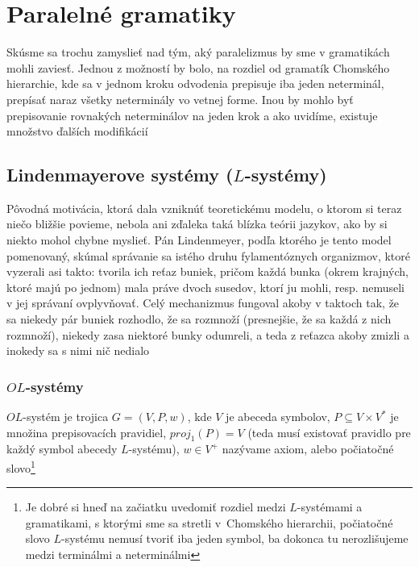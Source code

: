 \chapter{Paralelné gramatiky}

Skúsme sa trochu zamyslieť nad tým, aký paralelizmus by sme v
gramatikách mohli zaviesť. Jednou z možností by bolo, na rozdiel
od gramatík Chomského hierarchie, kde sa v jednom kroku odvodenia
prepisuje iba jeden neterminál, prepísať naraz všetky neterminály
vo vetnej forme. Inou by mohlo byť prepisovanie rovnakých
neterminálov na jeden krok a ako uvidíme, existuje množstvo
ďalších modifikácií

\section{Lindenmayerove systémy ($L$-systémy)}

\begin{motiv}
    Pôvodná motivácia, ktorá dala vzniknúť teoretickému modelu, o
    ktorom si teraz niečo bližšie povieme, nebola ani zďaleka taká
    blízka teórii jazykov, ako by si niekto mohol chybne myslieť. Pán
    Lindenmeyer, podľa ktorého je tento model pomenovaný, skúmal
    správanie sa istého druhu fylamentóznych organizmov, ktoré
    vyzerali asi takto: tvorila ich reťaz buniek, pričom každá bunka
    (okrem krajných, ktoré majú po jednom) mala práve dvoch susedov,
    ktorí ju mohli, resp. nemuseli v jej správaní ovplyvňovať. Celý
    mechanizmus fungoval akoby v taktoch tak, že sa niekedy pár buniek
    rozhodlo, že sa rozmnoží (presnejšie, že sa každá z nich
    rozmnoží), niekedy zasa niektoré bunky odumreli, a teda z reťazca
    akoby zmizli a inokedy sa s nimi nič nedialo
\end{motiv}

\subsection{$OL$-systémy}

\begin{definicia}
    $OL$-systém je trojica $G=(V,P,w)$, kde $V$ je abeceda symbolov,
    \mbox{$P\subseteq V\times V^{*}$} je množina prepisovacích
    pravidiel, $proj_{1}(P)=V$ (teda musí existovať pravidlo pre každý
    symbol abecedy $L$-systému), $w\in V^{+}$ nazývame axiom, alebo
    počiatočné slovo\footnote{Je dobré si hneď na začiatku uvedomiť
    rozdiel medzi $L$-systémami a gramatikami, s ktorými sme sa
    stretli \mbox{v Chomského} hierarchii, počiatočné slovo
    $L$-systému nemusí tvoriť iba jeden symbol, ba dokonca tu
    nerozlišujeme medzi terminálmi a neterminálmi}
\end{definicia}


